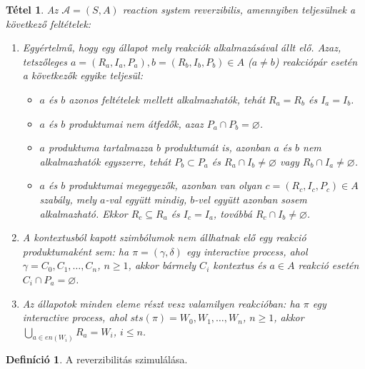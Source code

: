 \documentclass[12pt]{article}
\theoremstyle{definition}
\newtheorem*{definition*}{Definíció}
\theoremstyle{plain}
\newtheorem*{theorem*}{Tétel}
\let\emptyset\varnothing
\begin{document}
    \begin{theorem*}
        Az $\mathcal{A} = (S, A)$ \textit{reaction system} reverzibilis, amennyiben teljesülnek a következő feltételek:
        \begin{enumerate}[label={(\arabic*)}]
            \item
            Egyértelmű, hogy egy állapot mely reakciók alkalmazásával állt elő. Azaz, tetszőleges $a = (R_{a}, I_{a}, P_{a}), b = (R_{b}, I_{b}, P_{b}) \in A$ ($a \neq b$) reakciópár esetén a következők egyike teljesül:
            \begin{itemize}
                \item
                $a$ és $b$ azonos feltételek mellett alkalmazhatók, tehát $R_{a} = R_{b}$ és $I_{a} = I_{b}$.

                \item
                $a$ és $b$ produktumai nem átfedők, azaz $P_{a} \cap P_{b} = \emptyset$.

                \item
                $a$ produktuma tartalmazza $b$ produktumát is, azonban $a$ és $b$ nem alkalmazhatók egyszerre, tehát $P_{b} \subset P_{a}$ és $R_{a} \cap I_{b} \neq \emptyset$ vagy $R_{b} \cap I_{a} \neq \emptyset$.

                \item
                $a$ és $b$ produktumai megegyezők, azonban van olyan $c = (R_{c}, I_{c}, P_{c}) \in A$ szabály, mely $a$-val együtt mindig, $b$-vel együtt azonban sosem alkalmazható. Ekkor $R_{c} \subseteq R_{a}$ és $I_{c} = I_{a}$, továbbá $R_{c} \cap I_{b} \neq \emptyset$.
            \end{itemize} 

            \item
            A kontextusból kapott szimbólumok nem állhatnak elő egy reakció produktumaként sem: ha $\pi = (\gamma, \delta)$ egy \textit{interactive process}, ahol $\gamma = C_{0}, C_{1}, \ldots, C_{n}$, $n \geq 1$, akkor bármely $C_{i}$ kontextus és $a \in A$ reakció esetén $C_{i} \cap P_{a} = \emptyset$.

            \item
            Az állapotok minden eleme részt vesz valamilyen reakcióban: ha $\pi$ egy \textit{interactive process}, ahol $\textit{sts}(\pi) = W_{0}, W_{1}, \ldots, W_{n}$, $n \geq 1$, akkor $\bigcup_{a \in \textit{en}(W_{i})} R_{a} = W_{i}$, $i \leq n$.
        \end{enumerate}
    \end{theorem*}

    \begin{definition*}
        A reverzibilitás szimulálása.
    \end{definition*}
\end{document}
